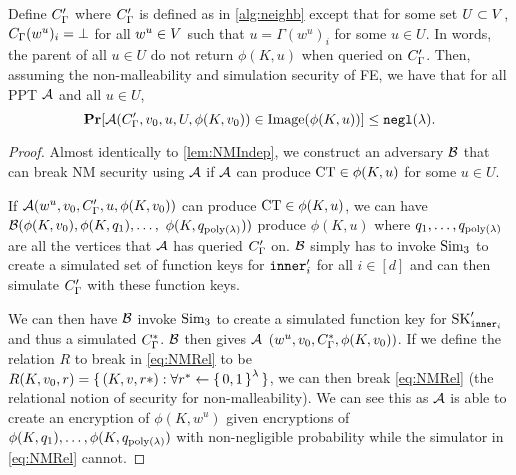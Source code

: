 \begin{lemma}
		\label{lem:NMIndepA}
		Define $C_\Gamma'$ where $C_\Gamma'$ is defined as in \cref{alg:neighb} except that
		for some set $U \subset V$, $C_\Gamma(w^u)_i = \bot$ for all $w^u \in V$ such that $u = \Gamma(w^u)_i$ for some $u \in U$.
		In words, the parent of all $u \in U$ do not return $\phi(K, u)$ when queried on $C_\Gamma'$.
		Then, assuming the non-malleability and simulation security of FE, we have that for all PPT $\mathcal{A}$
		and all $u \in U$,
		\begin{equation}
			\operatorname*{\mathbf{Pr}}[\mathcal{A}(C_\Gamma', v_0, u, U, \phi(K, v_0)) \in \text{Image}(\phi(K, u))] \leq \texttt{negl}(\lambda).
		\end{equation}
		\begin{proof}
			Almost identically to \cref{lem:NMIndep}, we construct an adversary $\mathcal{B}$ that can break NM security using $\mathcal{A}$ if $\mathcal{A}$ can
			produce $\text{CT} \in \phi(K, u)$ for some $u \in U$.
			
			If $\mathcal{A}(w^u, v_0, C_\Gamma', u, \phi(K, v_0))$ can produce $\text{CT} \in \phi(K, u)$,
			we can have $\mathcal{B}(\phi(K, v_0), \phi(K, q_1), \dots,$ $ \phi(K,q_{\operatorname{poly}(\lambda)}))$ 
			produce $\phi(K, u)$ where $q_1, \dots, q_{\operatorname{poly}(\lambda)}$ are all the vertices that $\mathcal{A}$ has queried $C_\Gamma'$ on.
			$\mathcal{B}$ simply has to invoke $\text{Sim}_3$ to create a simulated set of function keys for $\texttt{inner}_i'$ for all $i \in [d]$
			and can then simulate $C_\Gamma'$ with these function keys.

			We can then have $\mathcal{B}$ invoke $\text{Sim}_3$ to create a simulated function key for $\text{SK}_{\texttt{inner}_i}'$
			and thus a simulated $C_\Gamma^{*}$.
			$\mathcal{B}$ then gives $\mathcal{A}$ $(w^u, v_0, C_\Gamma^{*}, \phi(K, v_0))$.
			If we define the relation $R$ to break in \cref{eq:NMRel} to be $R(K, v_0, r) = \set{(K, v, r*) : \forall r^* \gets \set{0, 1}^\lambda}$,
			we can then break \cref{eq:NMRel} (the relational notion of security for non-malleability).
			We can see this as $\mathcal{A}$ is able to create an encryption of $\phi(K, w^u)$
			given encryptions of $\phi(K, q_1), \dots, \phi(K, q_{\operatorname{poly}(\lambda)})$
			with non-negligible probability while the simulator 
			in \cref{eq:NMRel} cannot.
		\end{proof}
\end{lemma}

